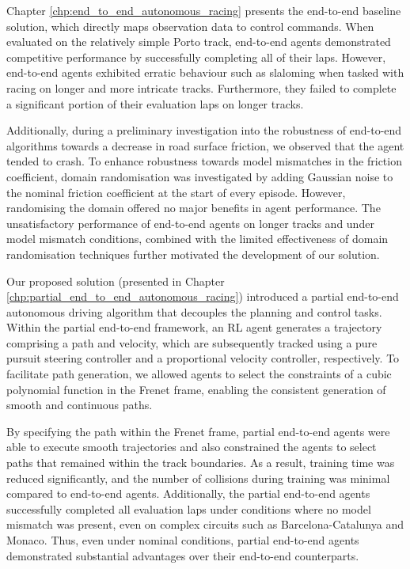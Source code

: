 Chapter \ref{chp:end_to_end_autonomous_racing} presents the end-to-end baseline solution, which directly maps observation data to control commands.
When evaluated on the relatively simple Porto track, end-to-end agents demonstrated competitive performance by successfully completing all of their laps.
However, end-to-end agents exhibited erratic behaviour such as slaloming when tasked with racing on longer and more intricate tracks.
Furthermore, they failed to complete a significant portion of their evaluation laps on longer tracks.


Additionally, during a preliminary investigation into the robustness of end-to-end algorithms towards a decrease in road surface friction, we observed that the agent tended to crash.
To enhance robustness towards model mismatches in the friction coefficient, domain randomisation was investigated by adding Gaussian noise to the nominal friction coefficient at the start of every episode.
However, randomising the domain offered no major benefits in agent performance.
The unsatisfactory performance of end-to-end agents on longer tracks and under model mismatch conditions, combined with the limited effectiveness of domain randomisation techniques further motivated the development of our solution.


Our proposed solution (presented in Chapter \ref{chp:partial_end_to_end_autonomous_racing}) introduced a partial end-to-end autonomous driving algorithm  that decouples the planning and control tasks.
Within the partial end-to-end framework, an RL agent generates a trajectory comprising a path and velocity, which are subsequently tracked using a pure pursuit steering controller and a proportional velocity controller, respectively.
To facilitate path generation, we allowed agents to select the constraints of a cubic polynomial function in the Frenet frame, enabling the consistent  generation of smooth and continuous paths.


By specifying the path within the Frenet frame, partial end-to-end agents were able to execute smooth trajectories and also constrained the agents to select paths that remained within the track boundaries. 
As a result, training time was reduced significantly, and the number of collisions during training was minimal compared to end-to-end agents.
Additionally, the partial end-to-end agents successfully completed all evaluation laps under conditions where no model mismatch was present, even on complex circuits such as Barcelona-Catalunya and Monaco. 
Thus, even under nominal conditions, partial end-to-end agents demonstrated substantial advantages over their end-to-end counterparts.


